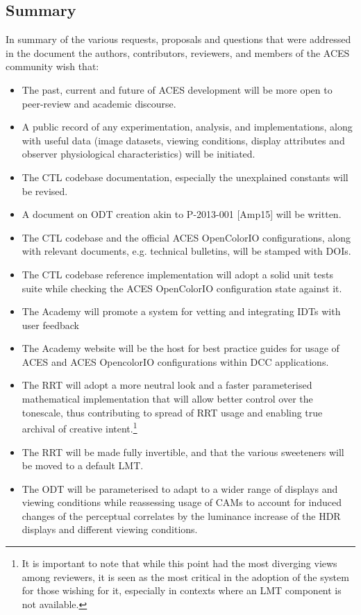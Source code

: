 \documentclass[conference]{IEEEtran}
\begin{document}
\subsection{Summary}
In summary of the various requests, proposals and questions that were addressed in the document the authors, contributors, reviewers, and members of the ACES community wish that:
\begin{itemize}
	\item The past, current and future of ACES development will be more open to peer-review and academic discourse.
	\item A public record of any experimentation, analysis, and implementations, along with useful data (image datasets, viewing conditions, display attributes and observer physiological characteristics) will be initiated.
	\item The CTL codebase documentation, especially the unexplained constants will be revised.
	\item A document on ODT creation akin to P-2013-001 [Amp15] will be written.
	\item The CTL codebase and the official ACES OpenColorIO configurations, along with relevant documents, e.g. technical bulletins, will be stamped with DOIs.
	\item The CTL codebase reference implementation will adopt a solid unit tests suite while checking the ACES OpenColorIO configuration state against it.
	\item The Academy will promote a system for vetting and integrating IDTs with user feedback
	\item The Academy website will be the host for best practice guides for usage of ACES and ACES OpencolorIO configurations within DCC applications.
	\item The RRT will adopt a more neutral look and a faster parameterised mathematical implementation that will allow better control over the tonescale, thus contributing to spread of RRT usage and enabling true archival of creative intent.\footnote{It is important to note that while this point had the most diverging views among reviewers, it is seen as the most critical in the adoption of the system for those wishing for it, especially in contexts where an LMT component is not available.}
	\item The RRT will be made fully invertible, and that the various sweeteners will be moved to a default LMT.
	\item The ODT will be parameterised to adapt to a wider range of displays and viewing conditions while reassessing usage of CAMs to account for induced changes of the perceptual correlates by the luminance increase of the HDR displays and different viewing conditions.

\end{itemize}
\end{document}

